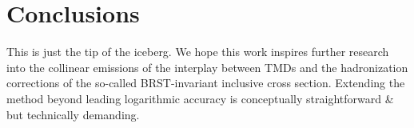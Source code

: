 \section{Conclusions}\label{sec:conclusions}

This is just the tip of the iceberg. We hope this work inspires further
research into the collinear emissions of the interplay between TMDs and
the hadronization corrections of the so-called BRST-invariant inclusive
cross section. Extending the method beyond leading logarithmic accuracy
is conceptually straightforward & but technically demanding.


